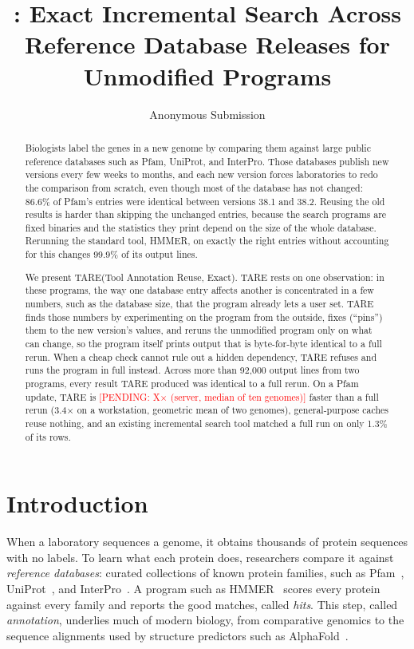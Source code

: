 \documentclass[letterpaper,twocolumn,10pt]{article}
\title{\sys: Exact Incremental Search Across\\
Reference Database Releases for Unmodified Programs}
\author{Anonymous Submission}
\date{}
\theoremstyle{definition}
\newcommand{\sys}{TARE\xspace}
\newcommand{\pending}[1]{\textcolor{red}{[PENDING: #1]}}
\begin{document}
\maketitle

\begin{abstract}
Biologists label the genes in a new genome by comparing them against large public reference databases such
as Pfam, UniProt, and InterPro. Those databases publish new versions every few weeks to months, and each new
version forces laboratories to redo the comparison from scratch, even though most of the database has not
changed: 86.6\% of Pfam's entries were identical between versions 38.1 and 38.2. Reusing the old results
is harder than skipping the unchanged entries, because the search programs are fixed binaries and the
statistics they print depend on the size of the whole database. Rerunning the standard tool, HMMER, on
exactly the right entries without accounting for this changes 99.9\% of its output lines.

We present \sys (Tool Annotation Reuse, Exact). \sys rests on one observation: in these programs, the way
one database entry affects another is concentrated in a few numbers, such as the database size, that the
program already lets a user set. \sys finds those numbers by experimenting on the program from the outside,
fixes (``pins'') them to the new version's values, and reruns the unmodified program only on what can
change, so the program itself prints output that is byte-for-byte identical to a full rerun. When a cheap
check cannot rule out a hidden dependency, \sys refuses and runs the program in full instead. Across more
than 92{,}000 output lines from two programs, every result \sys produced was identical to a full rerun. On a Pfam update, \sys is \pending{X$\times$ (server, median of ten genomes)} faster than a full rerun (3.4$\times$ on a
workstation, geometric mean of two genomes),
general-purpose caches reuse nothing, and an existing incremental search tool matched a full run on only
1.3\% of its rows.
\end{abstract}

\section{Introduction}
\label{sec:intro}

When a laboratory sequences a genome, it obtains thousands of protein sequences with no labels. To learn what
each protein does, researchers compare it against \textit{reference databases}: curated collections of known
protein families, such as Pfam~\cite{pfam2025}, UniProt~\cite{uniprot2025}, and InterPro~\cite{paysanlafosse2023interpro}.
A program such as HMMER~\cite{eddy2011hmmer} scores every protein against every family and reports the good
matches, called \textit{hits}. This step, called \textit{annotation}, underlies much of modern biology, from
comparative genomics to the sequence alignments used by structure predictors such as AlphaFold~\cite{jumper2021alphafold}.
\end{document}
